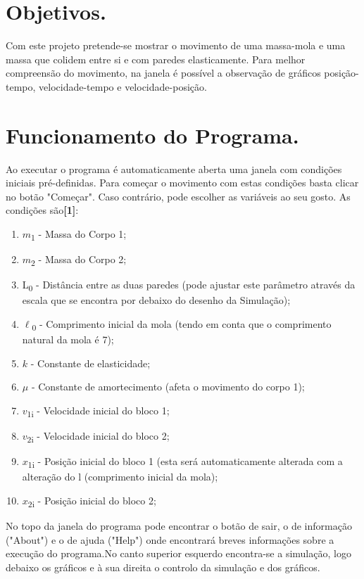 \documentclass{article}
\begin{document}
\section{Objetivos.}
Com este projeto pretende-se mostrar o movimento de uma massa-mola e uma massa que colidem entre si e com paredes elasticamente. Para melhor compreensão do movimento, na janela é possível a observação de gráficos posição-tempo, velocidade-tempo e velocidade-posição.

\section{Funcionamento do Programa.}
Ao executar o programa é automaticamente aberta uma janela com condições iniciais pré-definidas. Para começar o movimento com estas condições basta clicar no botão "Começar". Caso contrário, pode escolher as variáveis ao seu gosto. As condições são\hypertarget{mylink}{\textbf{[1]}}:
\begin{enumerate}
\item $m$\textsubscript{1} - Massa do Corpo 1;
\item $m$\textsubscript{2} - Massa do Corpo 2;
\item L\textsubscript{0} - Distância entre as duas paredes (pode ajustar este parâmetro através da escala que se encontra por debaixo do desenho da Simulação);
\item $\ell$\textsubscript{0} - Comprimento inicial da mola (tendo em conta que o comprimento natural da mola é 7);
\item $k$ - Constante de elasticidade;
\item $\mu$ - Constante de amortecimento (afeta o movimento do corpo 1);
\item $v$\textsubscript{1i} - Velocidade inicial do bloco 1;
\item $v$\textsubscript{2i} - Velocidade inicial do bloco 2;
\item $x$\textsubscript{1i} - Posição inicial do bloco 1 (esta será automaticamente alterada com a
alteração do l (comprimento inicial da mola);
\item $x$\textsubscript{2i} - Posição inicial do bloco 2;
\end{enumerate}

No topo da janela do programa pode encontrar o botão de sair, o de informação ("About") e o de ajuda ("Help") onde encontrará breves informações sobre a execução do programa.No canto superior esquerdo encontra-se a simulação, logo debaixo os gráficos e à sua direita o controlo da simulação e dos gráficos.
\end{document}
